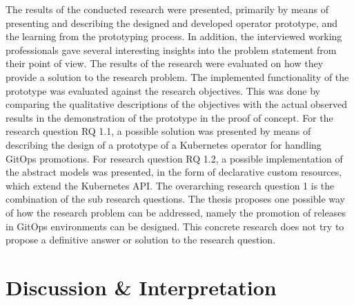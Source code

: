 The results of the conducted research were presented, primarily by means of
presenting and describing the designed and developed operator prototype, and the learning
from the prototyping process.
In addition, the interviewed working professionals gave several interesting insights into the problem
statement from their point of view.
The results of the research were evaluated on how they provide a solution to the research problem.
The implemented functionality of the prototype was evaluated against the research objectives.
This was done by comparing the qualitative descriptions of the objectives with the actual observed results
in the demonstration of the prototype in the proof of concept.
For the research question RQ 1.1,
a possible solution was presented by means of
describing the design of a prototype of a Kubernetes operator for handling GitOps promotions.
For research question RQ 1.2,
a possible implementation of the abstract models was presented, in the form of
declarative custom resources, which extend the Kubernetes API.
The overarching research question 1 is the combination of the sub research questions.
The thesis proposes one possible way of how the research problem can be addressed,
namely the promotion of releases in GitOps environments can be designed.
This concrete research does not try to propose a definitive answer or solution to the research question.

\section*{Discussion \& Interpretation}

